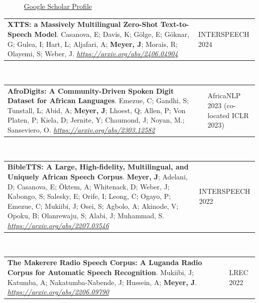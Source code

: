 \documentclass{cv} %
\begin{document}
  \begin{figure}[H]
    \begin{minipage}{\textwidth}
      \centering
      
      
        \href{https://scholar.google.com/citations?user=XiAmdnYAAAAJ}{Google Scholar Profile}
      \end{minipage}
  \end{figure}

\vspace{.25cm}

\begin{tabular}{@{}p{}p{}@{}}
  {\bf XTTS: a Massively Multilingual Zero-Shot Text-to-Speech Model}.
  {Casanova, E; Davis, K; Gölge, E; Göknar, G; Gulea, I; Hart, L; Aljafari, A; \textbf{Meyer, J}; Morais, R; Olayemi, S; Weber, J}.
  \emph{\url{https://arxiv.org/abs/2406.04904}}
  & {INTERSPEECH 2024}
\end{tabular}
       \\

\vspace{.25cm}

\begin{tabular}{@{}p{}p{}@{}}
  {\bf AfroDigits: A Community-Driven Spoken Digit Dataset for African Languages}.
  {Emezue, C; Gandhi, S; Tunstall, L; Abid, A; \textbf{Meyer, J}; Lhoest, Q; Allen, P; Von Platen, P; Kiela, D; Jernite, Y; Chaumond, J; Noyan, M.; Sanseviero, O}.
  \emph{\url{https://arxiv.org/abs/2303.12582}}
  & {AfricaNLP 2023 (co-located ICLR 2023)}
\end{tabular}
       \\

\begin{tabular}{@{}p{}p{}@{}}
  {\bf BibleTTS: A Large, High-fidelity, Multilingual, and Uniquely African Speech Corpus}.
  {\textbf{Meyer, J}; Adelani, D; Casanova, E; Öktem, A; Whitenack, D; Weber, J; Kabongo, S; Salesky, E; Orife, I; Leong, C; Ogayo, P; Emezue, C; Mukiibi, J; Osei, S; Agbolo, A; Akinode, V; Opoku, B; Olanrewaju, S; Alabi, J; Muhammad, S}.
  \emph{\url{https://arxiv.org/abs/2207.03546}}
  & {INTERSPEECH 2022}
\end{tabular}
\\
       
\begin{tabular}{@{}p{}p{}@{}}
  {\bf The Makerere Radio Speech Corpus: A Luganda Radio Corpus for Automatic Speech Recognition}.
  {Mukiibi, J; Katumba, A; Nakatumba-Nabende, J; Hussein, A; \textbf{Meyer, J}}.
  \emph{\url{https://arxiv.org/abs/2206.09790}}
  &
  {LREC 2022}
\end{tabular}
\\
\end{document}
